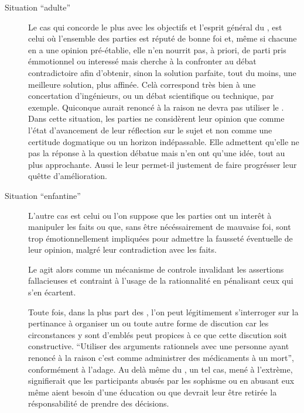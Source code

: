 \begin{description}
  \item[Situation \enquote{adulte}] Le cas qui concorde le plus avec les objectifs et l’esprit général du \mainabbr{}, est celui où l’ensemble des parties est réputé de bonne foi et, même si chacune en a une opinion pré-établie, elle n’en nourrit pas, à priori, de parti pris émmotionnel ou interessé mais cherche à la confronter au débat contradictoire afin d’obtenir, sinon la solution parfaite, tout du moins, une meilleure solution, plus affinée. Celà correspond très bien à une concertation d’ingénieurs, ou un débat scientifique ou technique, par exemple. Quiconque aurait renoncé à la raison ne devra pas utiliser le \mainabbr{}.
Dans cette situation, les parties ne considèrent leur opinion que comme l’état d’avancement de leur réflection sur le sujet et non comme une certitude dogmatique ou un horizon indépassable. Elle admettent qu’elle ne  pas la réponse à la question débatue mais n’en ont qu’une idée, tout au plus approchante. Aussi le \mainabbr{} leur permet-il justement de faire progrésser leur quêtte d’amélioration.

  \item[Situation \enquote{enfantine}] L’autre cas est celui ou l’on suppose que les parties ont un interêt à manipuler les faits ou que, sans être nécéssairement de mauvaise foi, sont trop émotionnellement impliquées pour admettre la fausseté éventuelle de leur opinion, malgré leur contradiction avec les faits.

  Le \mainabbr{} agit alors comme un mécanisme de controle invalidant les assertions fallacieuses et contraint à l’usage de la rationnalité en pénalisant ceux qui s’en écartent.

  Toute fois, dans la plus part des , l’on peut légitimement s’interroger sur la pertinance à organiser un \mainabbr{} ou toute autre forme de discution car les circonstances y sont d’emblés peut propices à ce que cette discution soit constructive. \enquote{Utiliser des arguments rationnels avec une personne ayant renoncé à la raison c’est comme administrer des médicaments à un mort}\nocite{thomasPain1776AmercianCrisis}, conformément à l’adage. Au delà même du \mainabbr{}, un tel cas, mené à l’extrème, signifierait que les participants abusés par les sophisme ou en abusant eux même aient besoin d’une éducation ou que devrait leur être retirée la résponsabilité de prendre des décisions.
\end{description}


